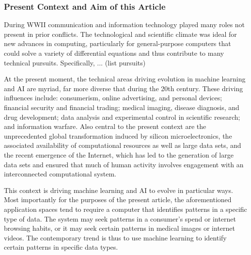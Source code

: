 \subsubsection{Present Context and Aim of this Article}
During WWII communication and information technology played many roles not present in prior conflicts. The technological and scientific climate was ideal for new advances in computing, particularly for general-purpose computers that could solve a variety of differential equations and thus contribute to many technical pursuits. Specifically, ... (list pursuits)

At the present moment, the technical areas driving evolution in machine learning and AI are myriad, far more diverse that during the 20th century. These driving influences include: consumerism, online advertising, and personal devices; financial security and financial trading; medical imaging, disease diagnosis, and drug development; data analysis and experimental control in scientific research; and information warfare. Also central to the present context are the unprecedented global transformation induced by silicon microelectronics, the associated availability of computational resources as well as large data sets, and the recent emergence of the Internet, which has led to the generation of large data sets and ensured that much of human activity involves engagement with an interconnected computational system.

This context is driving machine learning and AI to evolve in particular ways. Most importantly for the purposes of the present article, the aforementioned application spaces tend to require a computer that identifies patterns in a specific type of data. The system may seek patterns in a consumer's spend or internet browsing habits, or it may seek certain patterns in medical images or internet videos. The contemporary trend is thus to use machine learning to identify certain patterns in specific data types.

